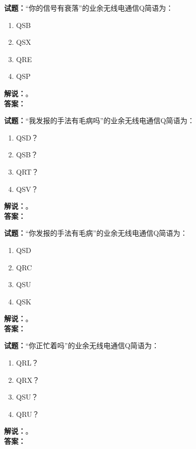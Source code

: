 \documentclass{ctexbook}
\begin{document}
\vspace{\baselineskip}

\noindent\textbf{试题：}“你的信号有衰落”的业余无线电通信Q简语为：
\begin{enumerate}[leftmargin=3em]
  \item QSB
  \item QSX
  \item QRE
  \item QSP
\end{enumerate}
\noindent\textbf{解说：}\textbf{}。\\\noindent\textbf{答案：}

\vspace{\baselineskip}

\noindent\textbf{试题：}“我发报的手法有毛病吗”的业余无线电通信Q简语为：
\begin{enumerate}[leftmargin=3em]
  \item QSD？
  \item QSB？
  \item QRT？
  \item QSV？
\end{enumerate}
\noindent\textbf{解说：}\textbf{}。\\\noindent\textbf{答案：}

\vspace{\baselineskip}

\noindent\textbf{试题：}“你发报的手法有毛病”的业余无线电通信Q简语为：
\begin{enumerate}[leftmargin=3em]
  \item QSD
  \item QRC
  \item QSU
  \item QSK
\end{enumerate}
\noindent\textbf{解说：}\textbf{}。\\\noindent\textbf{答案：}

\vspace{\baselineskip}

\noindent\textbf{试题：}“你正忙着吗”的业余无线电通信Q简语为：
\begin{enumerate}[leftmargin=3em]
  \item QRL？
  \item QRX？
  \item QSU？
  \item QRU？
\end{enumerate}
\noindent\textbf{解说：}\textbf{}。\\\noindent\textbf{答案：}
\end{document}
